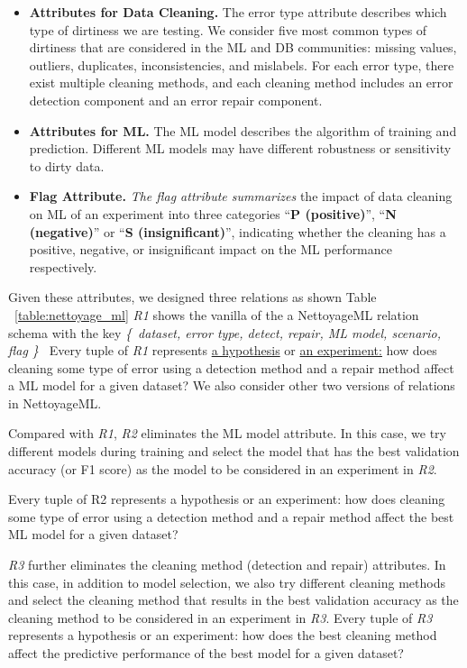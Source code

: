 \begin{itemize}
	\item {
	\textbf{Attributes for Data Cleaning.}	
		The error type attribute describes
		which type of dirtiness we are testing. We consider five most
		common types of dirtiness that are considered in the ML and
		DB communities: missing values, outliers, duplicates, inconsistencies, and mislabels. For each error type, there exist multiple
		cleaning methods, and each cleaning method includes an error
		detection component and an error repair component.
	}
\item {
	\textbf{Attributes for ML.}	
	The ML model describes the algorithm of
	training and prediction. Different ML models may have different
	robustness or sensitivity to dirty data.
}
\item {
	\textbf{Flag Attribute.}	
	\textit{The flag attribute summarizes } the impact of data cleaning on ML of an experiment into three categories “\textbf{P (positive)}”, “\textbf{N (negative)}” 
	or “\textbf{S (insignificant)}”, indicating whether
	the cleaning has a positive, negative, or insignificant impact on
	the ML performance respectively.
}
\end{itemize}

Given these attributes, we designed three relations as shown Table ~\ref{table:nettoyage_ml}
\textit{R1} shows the vanilla of the a NettoyageML relation schema with the key 
\textit{ \{\ dataset, error type, detect, repair, ML model, scenario, flag \}\ }
Every tuple of \textit{R1} represents \underline{a hypothesis} or \underline{an experiment:}
how does cleaning some type of error using a detection method and a repair method affect a ML model for a given dataset?
We also consider other two versions of relations in NettoyageML. 

Compared with \textit{R1}, \textit{R2} eliminates the ML model attribute. In this case,
we try different models during training and select the model that
has the best validation accuracy (or F1 score) as the model to be
considered in an experiment in \textit{R2}. 

Every tuple of R2 represents a hypothesis or an experiment: how does cleaning some type of error using a detection method and a repair method affect the best
ML model for a given dataset? 

\textit{R3} further eliminates the cleaning
method (detection and repair) attributes. In this case, in addition
to model selection, we also try different cleaning methods and select the cleaning method that results in the best validation accuracy
as the cleaning method to be considered in an experiment in \textit{R3}.
Every tuple of \textit{R3} represents a hypothesis or an experiment: how
does the best cleaning method affect the predictive performance of
the best model for a given dataset?

